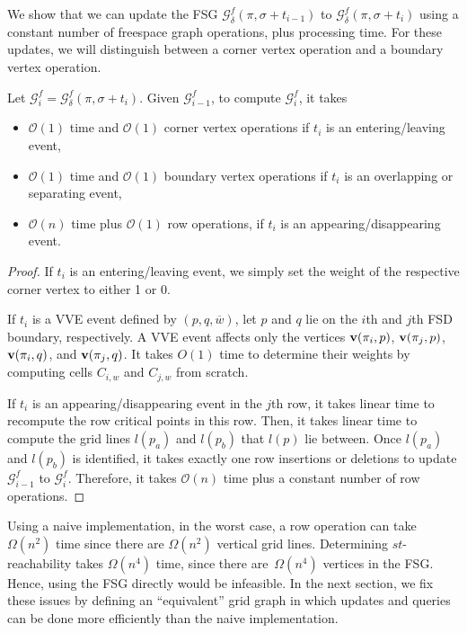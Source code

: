 \documentclass[thm-restate]{lipics-v2021}
\theoremstyle{remark}
\newcommand{\Oh}{\mathcal{O}}
\newcommand{\graph}[0]{\mathcal{G}}
\newcommand{\doublequote}[1]{``#1''}
\newcommand{\vertex}[1]{\normalfont \textbf{v}(#1)}
\newcommand{\fsgraph}[0]{\graph^{f}}
\newcommand{\cell}[1]{C_{#1}}
\newcommand{\cseg}[1]{\overline{#1}}
\begin{document}
We show that we can update the FSG $\fsgraph_\delta(\pi, \sigma + t_{i - 1})$ to $\fsgraph_\delta(\pi, \sigma + t_{i})$ using a constant number of freespace graph operations, plus processing time. For these updates, we will distinguish between a corner vertex operation and a boundary vertex operation.  

\begin{lemma} \label{lem:fsgraph-event-updates}
    Let $\fsgraph_i = \fsgraph_\delta(\pi, \sigma + t_i)$. Given $\fsgraph_{i - 1}$, to compute $\fsgraph_i$, it takes 
    \begin{itemize}
        \item $\Oh(1)$ time and $\Oh(1)$ corner vertex operations if $t_{i}$ is an entering/leaving event, 
        \item $\Oh(1)$ time and $\Oh(1)$ boundary vertex operations if $t_i$ is an overlapping or separating event, 
        \item $\Oh(n)$ time plus $\Oh(1)$ row operations, if $t_i$ is an appearing/disappearing event. 
    \end{itemize}
\end{lemma}

\begin{proof}
    If $t_i$ is an entering/leaving event, we simply set the weight of the respective corner vertex to either 1 or 0. 

    If $t_i$ is a VVE event defined by $(p, q, \cseg{w})$, let $p$ and $q$ lie on the $i$th and $j$th FSD boundary, respectively. A VVE event affects only the vertices $\vertex{\pi_i, p}$, $\vertex{\pi_j, p}$, $\vertex{\pi_i, q}$, and $\vertex{\pi_j, q}$. It takes $O(1)$ time to determine their weights by computing cells $\cell{i, w}$ and $\cell{j, w}$ from scratch. 

    If $t_i$ is an appearing/disappearing event in the $j$th row, it takes linear time to recompute the row critical points in this row. Then, it takes linear time to compute the grid lines $l(p_a)$ and $l(p_b)$ that $l(p)$ lie between. Once $l(p_a)$ and $l(p_b)$ is identified, it takes exactly one row insertions or deletions to update $\fsgraph_{i - 1}$ to $\fsgraph_i$. Therefore, it takes $\Oh(n)$ time plus a constant number of row operations.
\end{proof}

Using a naive implementation, in the worst case, a row operation can take $\Omega(n^2)$ time since there are $\Omega(n^2)$ vertical grid lines. Determining $st$-reachability takes $\Omega(n^4)$ time, since there are~$\Omega(n^4)$ vertices in the FSG.
Hence, using the FSG directly would be infeasible.
In the next section, we fix these issues by defining an \doublequote{equivalent} grid graph in which updates and queries can be done more efficiently than the naive implementation. 
\end{document}
